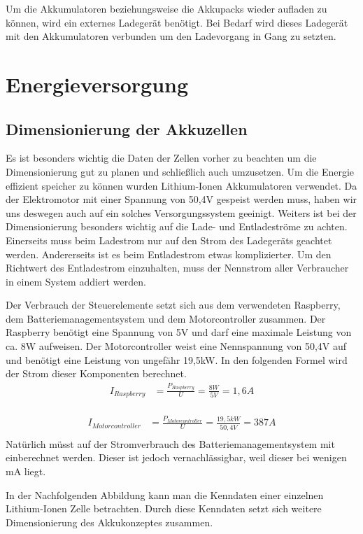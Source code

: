 Um die Akkumulatoren beziehungsweise die Akkupacks wieder aufladen zu können, wird ein externes Ladegerät benötigt. Bei Bedarf wird dieses Ladegerät mit den Akkumulatoren verbunden um den Ladevorgang in Gang zu setzten.
\newpage

\section{Energieversorgung}
\subsection{Dimensionierung der Akkuzellen}
Es ist besonders wichtig die Daten der Zellen vorher zu beachten um die Dimensionierung gut zu planen und schließlich auch umzusetzen. Um die Energie effizient speicher zu können wurden Lithium-Ionen Akkumulatoren verwendet. Da der Elektromotor mit einer Spannung von 50,4V gespeist werden muss, haben wir uns deswegen auch auf ein solches Versorgungssystem geeinigt. Weiters ist bei der Dimensionierung besonders wichtig auf die Lade- und Entladeströme zu achten. Einerseits muss beim Ladestrom nur auf den Strom des Ladegeräts geachtet werden. Andererseits ist es beim Entladestrom etwas komplizierter. Um den Richtwert des Entladestrom einzuhalten, muss der Nennstrom aller Verbraucher in einem System addiert werden.

Der Verbrauch der Steuerelemente setzt sich aus dem verwendeten Raspberry, dem Batteriemanagementsystem und dem Motorcontroller zusammen. Der Raspberry benötigt eine Spannung von 5V und darf eine maximale Leistung von ca. 8W aufweisen. Der Motorcontroller weist eine Nennspannung von 50,4V auf und benötigt eine Leistung von ungefähr 19,5kW. In den folgenden Formel wird der Strom dieser Komponenten berechnet.
\begin{align*}
I_{Raspberry} &= \frac{P_{Raspberry}}{U}=\frac{8 W}{5 V} = 1,6A\\
\end{align*}

\begin{align*}
I_{Motorcontroller} &= \frac{P_{Motorcontroller}}{U}=\frac{19,5 kW}{50,4 V} = 387 A\\
\end{align*}
Natürlich müsst auf der Stromverbrauch des Batteriemanagementsystem mit einberechnet werden. Dieser ist jedoch vernachlässigbar, weil dieser bei wenigen mA liegt.
\newpage

In der Nachfolgenden Abbildung kann man die Kenndaten einer einzelnen Lithium-Ionen Zelle betrachten. Durch diese Kenndaten setzt sich weitere Dimensionierung des Akkukonzeptes zusammen. 

